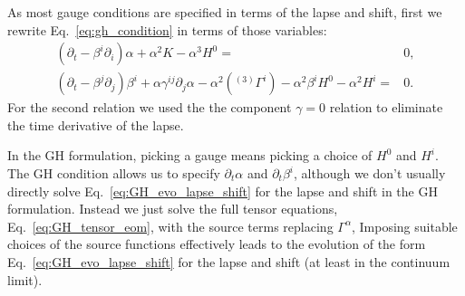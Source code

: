 \documentclass[%
notitlepage,
report,
nofootinbib,
 amsmath,amssymb,
 aps,
]{revtex4-1}
\begin{document}
   As most gauge conditions are specified in terms of the lapse and shift,
first we rewrite Eq.~\eqref{eq:gh_condition} in terms of those variables:
\begin{subequations}
\label{eq:GH_evo_lapse_shift}
\begin{align}
   \left(
      \partial_t
   -  \beta^i\partial_i
   \right)
   \alpha
   +  \alpha^2K
   -  \alpha^3H^0
   =&
   0
   ,\\
   \left(
      \partial_t
   -  \beta^j\partial_j
   \right)
   \beta^i
+  \alpha\gamma^{ij}\partial_j\alpha
-  \alpha^2\left({}^{(3)}\Gamma^i\right)
-  \alpha^2\beta^iH^0
-  \alpha^2H^i
   =&
   0
   .
\end{align}   
\end{subequations}
   For the second relation we used the the component $\gamma=0$ relation
to eliminate the time derivative of the lapse.

   In the GH formulation, picking a gauge means picking
a choice of $H^0$ and $H^i$.
The GH condition allows us to specify $\partial_t\alpha$
and $\partial_t\beta^i$, although we don't usually
directly solve Eq.~\eqref{eq:GH_evo_lapse_shift} for the lapse
and shift in the GH formulation.
Instead we just solve the full tensor equations, Eq.~\ref{eq:GH_tensor_eom},
with the source terms replacing $\Gamma^{\alpha}$,
Imposing suitable choices of the source functions 
effectively leads to the evolution of
the form Eq.~\eqref{eq:GH_evo_lapse_shift} for the lapse and shift
(at least in the continuum limit).

\end{document}
